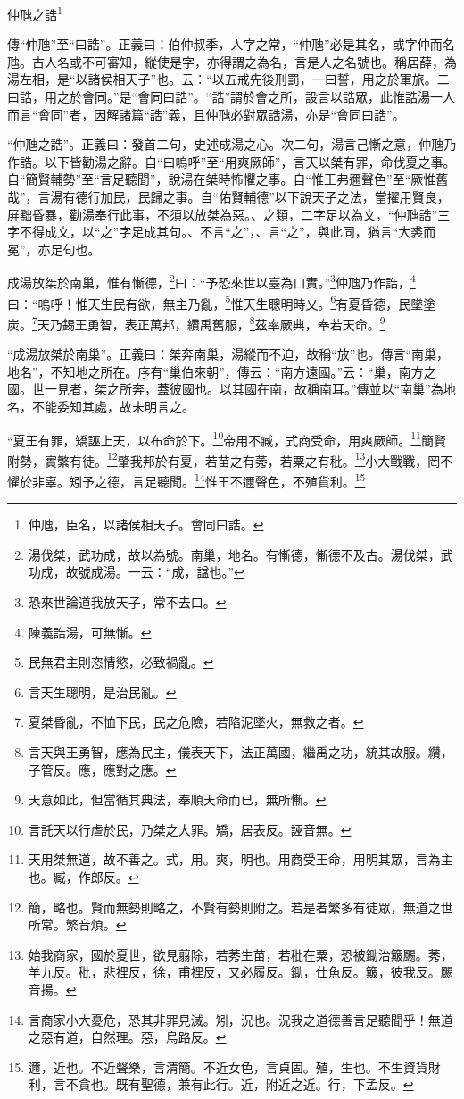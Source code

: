 仲虺之誥\footnote{仲虺，臣名，以諸侯相天子。會同曰誥。}


{\noindent\zhuan{}\fzbyks 傳“仲虺”至“曰誥”。正義曰：伯仲叔季，人字之常，“仲虺”必是其名，或字仲而名虺。古人名或不可審知，縱使是字，亦得謂之為名，言是人之名號也。稱居薛，為湯左相，是“以諸侯相天子”也。云：“以五戒先後刑罰，一曰誓，用之於軍旅。二曰誥，用之於會同。”是“會同曰誥”。“誥”謂於會之所，設言以誥眾，此惟誥湯一人而言“會同”者，因解諸篇“誥”義，且仲虺必對眾誥湯，亦是“會同曰誥”。 \par}

{\noindent\shu{}\fzkt “仲虺之誥”。正義曰：發首二句，史述成湯之心。次二句，湯言己慚之意，仲虺乃作誥。以下皆勸湯之辭。自“曰嗚呼”至“用爽厥師”，言天以桀有罪，命伐夏之事。自“簡賢輔勢”至“言足聽聞”，說湯在桀時怖懼之事。自“惟王弗邇聲色”至“厥惟舊哉”，言湯有德行加民，民歸之事。自“佑賢輔德”以下說天子之法，當擢用賢良，屏黜昏暴，勸湯奉行此事，不須以放桀為惡。、之類，二字足以為文，“仲虺誥”三字不得成文，以“之”字足成其句。、不言“之”，、言“之”，與此同，猶言“大裘而冕”，亦足句也。 \par}

成湯放桀於南巢，惟有慚德，\footnote{湯伐桀，武功成，故以為號。南巢，地名。有慚德，慚德不及古。湯伐桀，武功成，故號成湯。一云：“成，諡也。”}曰：“予恐來世以臺為口實。”\footnote{恐來世論道我放天子，常不去口。}仲虺乃作誥，\footnote{陳義誥湯，可無慚。}曰：“嗚呼！惟天生民有欲，無主乃亂，\footnote{民無君主則恣情慾，必致禍亂。}惟天生聰明時乂。\footnote{言天生聰明，是治民亂。}有夏昏德，民墜塗炭。\footnote{夏桀昏亂，不恤下民，民之危險，若陷泥墜火，無救之者。}天乃錫王勇智，表正萬邦，纘禹舊服，\footnote{言天與王勇智，應為民主，儀表天下，法正萬國，繼禹之功，統其故服。纘，子管反。應，應對之應。}茲率厥典，奉若天命。\footnote{天意如此，但當循其典法，奉順天命而已，無所慚。}

{\noindent\shu{}\fzkt “成湯放桀於南巢”。正義曰：桀奔南巢，湯縱而不迫，故稱“放”也。傳言“南巢，地名”，不知地之所在。序有“巢伯來朝”，傳云：“南方遠國。”云：“巢，南方之國。世一見者，桀之所奔，蓋彼國也。以其國在南，故稱南耳。”傳並以“南巢”為地名，不能委知其處，故未明言之。 \par}

“夏王有罪，矯誣上天，以布命於下。\footnote{言託天以行虐於民，乃桀之大罪。矯，居表反。誣音無。}帝用不臧，式商受命，用爽厥師。\footnote{天用桀無道，故不善之。式，用。爽，明也。用商受王命，用明其眾，言為主也。臧，作郎反。}簡賢附勢，實繁有徒。\footnote{簡，略也。賢而無勢則略之，不賢有勢則附之。若是者繁多有徒眾，無道之世所常。繁音煩。}肇我邦於有夏，若苗之有莠，若粟之有秕。\footnote{始我商家，國於夏世，欲見翦除，若莠生苗，若秕在粟，恐被鋤治簸颺。莠，羊九反。秕，悲裡反，徐，甫裡反，又必履反。鋤，仕魚反。簸，彼我反。颺音揚。}小大戰戰，罔不懼於非辜。矧予之德，言足聽聞。\footnote{言商家小大憂危，恐其非罪見滅。矧，況也。況我之道德善言足聽聞乎！無道之惡有道，自然理。惡，烏路反。}惟王不邇聲色，不殖貨利。\footnote{邇，近也。不近聲樂，言清簡。不近女色，言貞固。殖，生也。不生資貨財利，言不貪也。既有聖德，兼有此行。近，附近之近。行，下孟反。}


